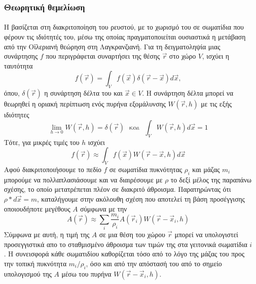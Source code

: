 \subsubsection{Θεωρητική θεμελίωση}
\paragraph{} Η  βασίζεται στη διακριτοποίηση του ρευστού, με το χωρισμό του σε
σωματίδια που φέρουν τις ιδιότητές του, μέσω της οποίας πραγματοποιείται ουσιαστικά η
μετάβαση από την Οϊλεριανή θεώρηση στη Λαγκρανζιανή. Για τη δειγματοληψία μιας συνάρτησης
$f$ που περιγράφεται συναρτήσει της θέσης $\vec{r}$ στο χώρο $V$, ισχύει η ταυτότητα
\begin{equation}
  f(\vec{r}) = \int_Vf(\vec{x}) \delta(\vec{r} - \vec{x}) d\vec{x},
\end{equation}
όπου, $\delta(\vec{r})$ η συνάρτηση δέλτα του  και $\vec{x} \in V$. Η συνάρτηση
δέλτα μπορεί να θεωρηθεί η οριακή περίπτωση ενός πυρήνα εξομάλυνσης $W(\vec{r}, h)$ με τις
εξής ιδιότητες
\begin{equation}
  \label{eq:kernel-properties}
  \lim_{h\to0}W(\vec{r}, h) = \delta(\vec{r})\ \ \
  \text{και}\ \ \
  \int_VW(\vec{r}, h) d\vec{x} = 1
\end{equation}
Τότε, για μικρές τιμές του $h$ ισχύει
\begin{equation}
  \label{eq:c-approx}
  f(\vec{r}) \approx \int_V f(\vec{x}) W(\vec{r}-\vec{x}, h) d\vec{x}
\end{equation}
Αφού διακριτοποιήσουμε το πεδίο $f$ σε σωματίδια πυκνότητας $\rho_i$ και μάζας $m_i$
μπορούμε να πολλαπλασιάσουμε και να διαιρέσουμε με $\rho$ το δεξί μέλος της παραπάνω
σχέσης, το οποίο μετατρέπεται πλέον σε διακριτό άθροισμα.  Παρατηρώντας ότι
$\rho*d\vec{x} = m$, καταλήγουμε στην ακόλουθη σχέση που αποτελεί τη βάση προσέγγισης
οποιουδήποτε μεγέθους $A$ σύμφωνα με την \eng{SPH}
\begin{equation}
  \label{eq:d-approx}
  A(\vec{r}) \approx \sum_i \frac{m_i}{\rho_i} A(\vec{r}_i) W(\vec{r}-\vec{x}_i, h)
\end{equation}
Σύμφωνα με αυτή, η τιμή της $A$ σε μια θέση του χώρου $\vec{r}$ μπορεί να υπολογιστεί
προσεγγιστικά απο το σταθμισμένο άθροισμα των τιμών της στα γειτονικά σωματίδια $i$.  Η
συνεισφορά κάθε σωματιδίου καθορίζεται τόσο από το λόγο της μάζας του προς την τοπική
πυκνότητα $m_i/\rho_i$, όσο και από την απόστασή του από το σημείο υπολογισμού της $A$
μέσω του πυρήνα $W(\vec{r}-\vec{x}_i, h)$.

